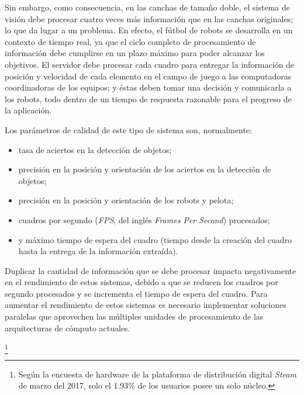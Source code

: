 Sin embargo, como consecuencia, en las canchas de tamaño doble, el sistema de
visión debe procesar cuatro veces más información que en las canchas originales;
lo que da lugar a un problema. En efecto, el fútbol de robots se desarrolla en
un contexto de tiempo real, ya que el ciclo completo de procesamiento de
información debe cumplirse en un plazo máximo para poder alcanzar los objetivos.
El servidor debe procesar cada cuadro para entregar la información de posición y
velocidad de cada elemento en el campo de juego a las computadoras coordinadoras
de los equipos; y éstas deben tomar una decisión y comunicarla a los robots,
todo dentro de un tiempo de respuesta razonable para el progreso de la
aplicación.

Los parámetros de calidad de este tipo de sistema son, normalmente:

\begin{itemize}

	\item 	tasa de aciertos en la detección de objetos;

	\item 	precisión en la posición y orientación de los aciertos en la
		detección de objetos;

	\item 	precisión en la posición y orientación de los robots y pelota;

	\item 	cuadros por segundo (\emph{FPS}, del inglés \emph{Frames Per
		Second}) procesados;

	\item 	y máximo tiempo de espera del cuadro (tiempo desde la creación
		del cuadro hasta la entrega de la información extraída).

\end{itemize}

Duplicar la cantidad de información que se debe procesar impacta negativamente
en el rendimiento de estos sistemas, debido a que se reducen los cuadros por
segundo procesados y se incrementa el tiempo de espera del cuadro. Para aumentar
el rendimiento de estos sistemas es necesario implementar soluciones paralelas
que aprovechen las múltiples unidades de procesamiento de las arquitecturas de
cómputo actuales.

\footnote{Según la encuesta de hardware de la plataforma de distribución
digital \emph{Steam} de marzo del 2017, solo el $1.93$\% de los usuarios posee
un solo núcleo.}
